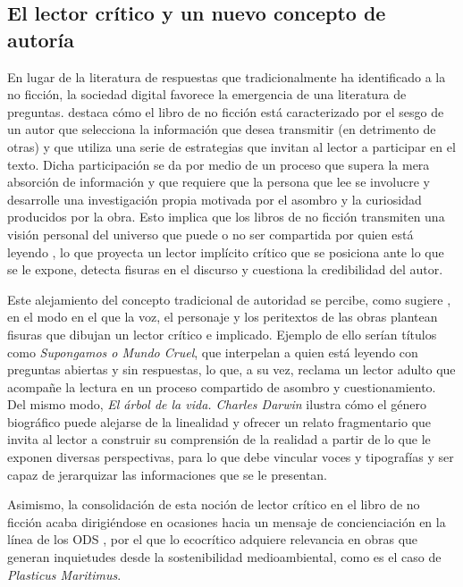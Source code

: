 \documentclass[spanish]{textolivre}
\begin{document}
\subsection{El lector crítico y un nuevo concepto de autoría}\label{sec-fmt-manuscrito}
En lugar de la literatura de respuestas que tradicionalmente ha identificado a la no ficción, la sociedad digital favorece la emergencia de una literatura de preguntas. \textcite{sanders_literature_2017} destaca cómo el libro de no ficción está caracterizado por el sesgo de un autor que selecciona la información que desea transmitir (en detrimento de otras) y que utiliza una serie de estrategias que invitan al lector a participar en el texto. Dicha participación se da por medio de un proceso que supera la mera absorción de información y que requiere que la persona que lee se involucre y desarrolle una investigación propia motivada por el asombro y la curiosidad producidos por la obra. Esto implica que los libros de no ficción transmiten una visión personal del universo que puede o no ser compartida por quien está leyendo \cite{grilli_beauty_2020b}, lo que proyecta un lector implícito crítico que se posiciona ante lo que se le expone, detecta fisuras en el discurso y cuestiona la credibilidad del autor.

Este alejamiento del concepto tradicional de autoridad se percibe, como sugiere \textcite{sanders_literature_2017}, en el modo en el que la voz, el personaje y los peritextos de las obras plantean fisuras que dibujan un lector crítico e implicado. Ejemplo de ello serían títulos como \textit{Supongamos o Mundo Cruel}, que interpelan a quien está leyendo con preguntas abiertas y sin respuestas, lo que, a su vez, reclama un lector adulto que acompañe la lectura en un proceso compartido de asombro y cuestionamiento. Del mismo modo, \textit{El árbol de la vida. Charles Darwin} ilustra cómo el género biográfico puede alejarse de la linealidad y ofrecer un relato fragmentario que invita al lector a construir su comprensión de la realidad a partir de lo que le exponen diversas perspectivas, para lo que debe vincular voces y tipografías y ser capaz de jerarquizar las informaciones que se le presentan.

Asimismo, la consolidación de esta noción de lector crítico en el libro de no ficción acaba dirigiéndose en ocasiones hacia un mensaje de concienciación en la línea de los ODS \cite{goga_ecocritical_2018}, por el que lo ecocrítico adquiere relevancia en obras que generan inquietudes desde la sostenibilidad medioambiental, como es el caso de \textit{Plasticus Maritimus}.
\end{document}
